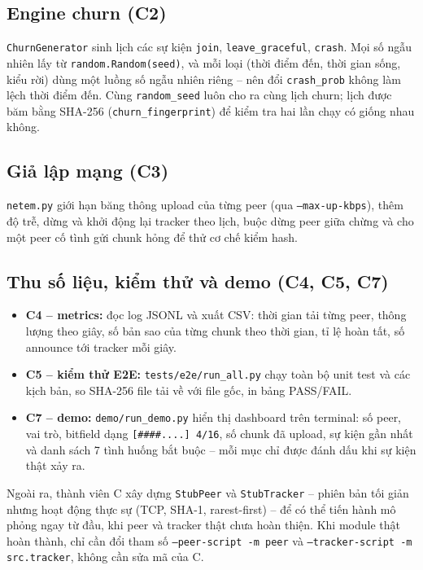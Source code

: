 \documentclass[12pt,a4paper,oneside]{report}
\begin{document}
\subsection{Engine churn (C2)}
\texttt{ChurnGenerator} sinh lịch các sự kiện \texttt{join}, \texttt{leave\_graceful}, \texttt{crash}. Mọi số ngẫu nhiên lấy từ \texttt{random.Random(seed)}, và mỗi loại (thời điểm đến, thời gian sống, kiểu rời) dùng một luồng số ngẫu nhiên riêng -- nên đổi \texttt{crash\_prob} không làm lệch thời điểm đến. Cùng \texttt{random\_seed} luôn cho ra cùng lịch churn; lịch được băm bằng SHA-256 (\texttt{churn\_fingerprint}) để kiểm tra hai lần chạy có giống nhau không.

\subsection{Giả lập mạng (C3)}
\texttt{netem.py} giới hạn băng thông upload của từng peer (qua \texttt{--max-up-kbps}), thêm độ trễ, dừng và khởi động lại tracker theo lịch, buộc dừng peer giữa chừng và cho một peer cố tình gửi chunk hỏng để thử cơ chế kiểm hash.

\subsection{Thu số liệu, kiểm thử và demo (C4, C5, C7)}
\begin{itemize}
  \item \textbf{C4 -- metrics:} đọc log JSONL và xuất CSV: thời gian tải từng peer, thông lượng theo giây, số bản sao của từng chunk theo thời gian, tỉ lệ hoàn tất, số announce tới tracker mỗi giây.
  \item \textbf{C5 -- kiểm thử E2E:} \texttt{tests/e2e/run\_all.py} chạy toàn bộ unit test và các kịch bản, so SHA-256 file tải về với file gốc, in bảng PASS/FAIL.
  \item \textbf{C7 -- demo:} \texttt{demo/run\_demo.py} hiển thị dashboard trên terminal: số peer, vai trò, bitfield dạng \texttt{[\#\#\#\#....] 4/16}, số chunk đã upload, sự kiện gần nhất và danh sách 7 tình huống bắt buộc -- mỗi mục chỉ được đánh dấu khi sự kiện thật xảy ra.
\end{itemize}

Ngoài ra, thành viên C xây dựng \texttt{StubPeer} và \texttt{StubTracker} -- phiên bản tối giản nhưng hoạt động thực sự (TCP, SHA-1, rarest-first) -- để có thể tiến hành mô phỏng ngay từ đầu, khi peer và tracker thật chưa hoàn thiện. Khi module thật hoàn thành, chỉ cần đổi tham số \texttt{--peer-script {}-m peer{}} và \texttt{--tracker-script {}-m src.tracker{}}, không cần sửa mã của C.
\end{document}
